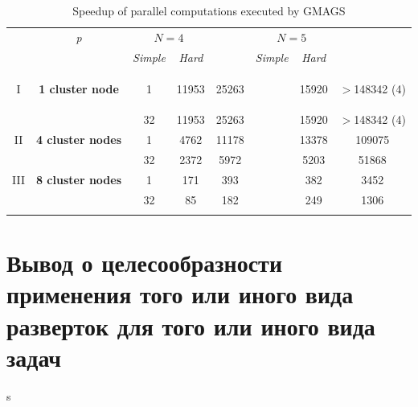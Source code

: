 \documentclass[runningheads]{llncs}
\begin{document}
\begin{table}
  \centering
  \caption{Speedup of parallel computations executed by GMAGS}
  \label{tab:4}
  \begin{tabular}{cccccccc}
    \cline{3-8}\noalign{\smallskip}
    \multicolumn{2}{c}{  } & \textit{p} & \multicolumn{2}{c}{$N=4$} & & \multicolumn{2}{c}{$N=5$}   \\
    \noalign{\smallskip} \cline{4-5} \cline{7-8}  \noalign{\smallskip}
    \multicolumn{2}{c}{  } & & \textit{Simple} & \textit{Hard} & & \textit{Simple} & \textit{Hard}  \\
    \noalign{\smallskip}\hline
    I &
    \parbox{0.25\textwidth}{
    \begin{center}
    \textbf{1 cluster node}
    \end{center}		}
      & 1 & 11953 & 25263 & & 15920 & \(>\)148342 (4)  \\
    &  & 32 & 11953 & 25263 & & 15920 & \(>\)148342 (4)  \\
    \hline \noalign{\smallskip}
II  & \textbf{4 cluster nodes}  %
  & 1 & 4762 & 11178 & & 13378 & 109075 \\
&   & 32 & 2372 & 5972 & & 5203 & 51868 \\
    \noalign{\smallskip}\hline	\noalign{\smallskip}
III & \textbf{8 cluster nodes} %
  & 1  & 171 & 393 & & 382 & 3452  \\
&    & 32 & 85 & 182 & & 249 & 1306 \\

    \noalign{\smallskip}\hline
  \end{tabular}
\end{table}

\section{Вывод о целесообразности применения того или иного вида разверток для того или иного вида задач}
s
\end{document}
